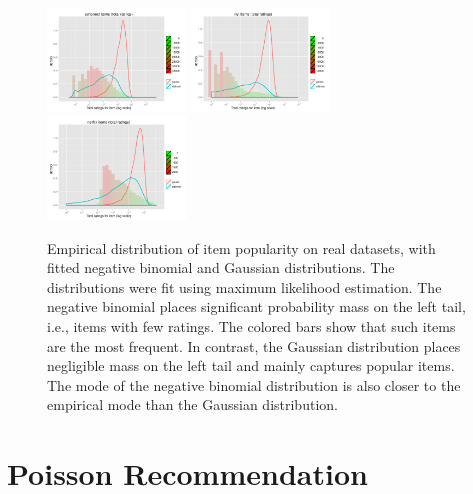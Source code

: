 \documentclass{sig-alternate}
\begin{document}
\begin{figure}[t!]
\includegraphics[width=0.33\textwidth]{figures/marginals/echonest.pdf}
\includegraphics[width=0.33\textwidth]{figures/marginals/nyt.pdf}
\includegraphics[width=0.33\textwidth]{figures/marginals/netflix.pdf}
\caption{Empirical distribution of item popularity on real datasets,
  with fitted negative binomial and Gaussian distributions. The
  distributions were fit using maximum likelihood estimation. The
  negative binomial places significant probability mass on the left
  tail, i.e., items with few ratings. The colored bars show that such
  items are the most frequent. In contrast, the Gaussian distribution
  places negligible mass on the left tail and mainly captures popular
  items. The mode of the negative binomial distribution is also closer
  to the empirical mode than the Gaussian distribution.}
\label{fig:marginals}
\end{figure}





\section{Poisson Recommendation}
\label{sec:model}

\end{document}
